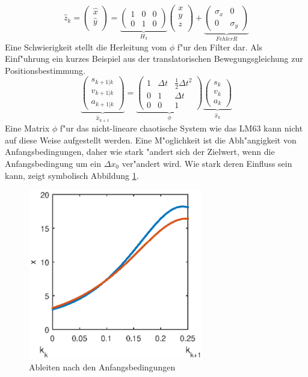\begin{refsection}
\[\hat{z}_{k}=
\begin{pmatrix}
\hat{x} \\
\hat{y} \\
\end{pmatrix}= 
\underbrace{\begin{pmatrix}
1 & 0 & 0  \\
0 & 1 & 0
\end{pmatrix}}_{H_{3}}
\begin{pmatrix}
x \\
y \\
z \\
\end{pmatrix}+
\underbrace{\begin{pmatrix}
\sigma_{x} & 0 \\
0 & \sigma_{y}
\end{pmatrix}}_{Fehler R}
\]
Eine Schwierigkeit stellt die Herleitung vom $\phi$ f"ur den Filter dar. Als Einf"uhrung ein kurzes Beispiel aus der translatorischen Bewegungsgleichung zur Positionsbestimmung.
\[
\underbrace{\begin{pmatrix}
s_{k+1|k} \\ 
v_{k+1|k} \\ 
a_{k+1|k}
\end{pmatrix}}_{\hat{x}_{k+1}}
=
\underbrace{\begin{pmatrix}
 1 & \Delta t & \frac{1}{2}\Delta t^{2} \\ 
 0 & 1 & \Delta t \\ 
 0 & 0 & 1
 \end{pmatrix}}_{\phi}
\underbrace{\begin{pmatrix}
   s_{k} \\ 
   v_{k} \\ 
   a_{k}
   \end{pmatrix}}_{\hat{x}_{k}}
\]
Eine Matrix $\phi$ f"ur das nicht-lineare chaotische System wie das LM63 kann nicht auf diese  Weise aufgestellt werden. Eine M"oglichkeit ist die Abh"angigkeit von Anfangsbedingungen, daher wie stark "andert sich der Zielwert, wenn die Anfangsbedingung um ein $\Delta x_{0}$ ver"andert wird. Wie stark deren Einfluss sein kann, zeigt symbolisch Abbildung \ref{skript:AblnachAnf}.

\begin{figure}
\centering
\includegraphics[width=3in]{kalman/figures/ablnachAnf2.eps}
\caption{Ableiten nach den Anfangsbedingungen}
\label{skript:AblnachAnf}
\end{figure}


\end{refsection}
